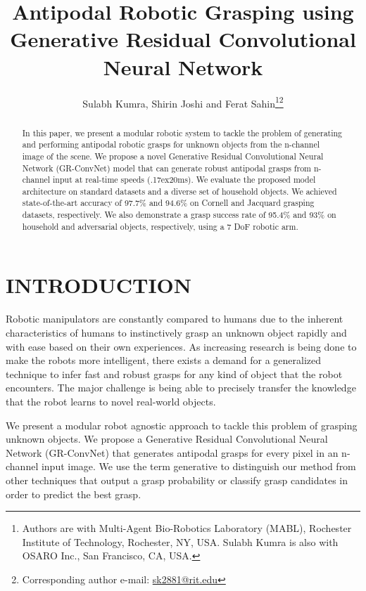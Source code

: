 \documentclass[letterpaper, 10 pt, conference]{ieeeconf}
\begin{document}
\title{\LARGE \bf
Antipodal Robotic Grasping using \\ Generative Residual Convolutional Neural Network
}

\author{Sulabh Kumra, Shirin Joshi and Ferat Sahin\thanks{Authors are with Multi-Agent Bio-Robotics Laboratory (MABL), Rochester Institute of Technology, Rochester, NY, USA. Sulabh Kumra is also with OSARO Inc., San Francisco, CA, USA.}\thanks{Corresponding author e-mail: \href{mailto:sk2881@rit.edu}{sk2881@rit.edu}}
}

\maketitle



\begin{abstract}
In this paper, we present a modular robotic system to tackle the problem of generating and performing antipodal robotic grasps for unknown objects from the n-channel image of the scene. We propose a novel Generative Residual Convolutional Neural Network (GR-ConvNet) model that can generate robust antipodal grasps from n-channel input at real-time speeds ({\raise.17ex\hbox{}}20ms). We evaluate the proposed model architecture on standard datasets and a diverse set of household objects. We achieved state-of-the-art accuracy of 97.7\% and 94.6\% on Cornell and Jacquard grasping datasets, respectively. We also demonstrate a grasp success rate of 95.4\% and 93\% on household and adversarial objects, respectively, using a 7 DoF robotic arm.
\end{abstract}



\section{INTRODUCTION}
Robotic manipulators are constantly compared to humans due to the inherent characteristics of humans to instinctively grasp an unknown object rapidly and with ease based on their own experiences. As increasing research is being done to make the robots more intelligent, there exists a demand for a generalized technique to infer fast and robust grasps for any kind of object that the robot encounters. The major challenge is being able to precisely transfer the knowledge that the robot learns to novel real-world objects.

We present a modular robot agnostic approach to tackle this problem of grasping unknown objects. We propose a Generative Residual Convolutional Neural Network (GR-ConvNet) that generates antipodal grasps for every pixel in an n-channel input image. We use the term generative to distinguish our method from other techniques that output a grasp probability or classify grasp candidates in order to predict the best grasp.
\end{document}
